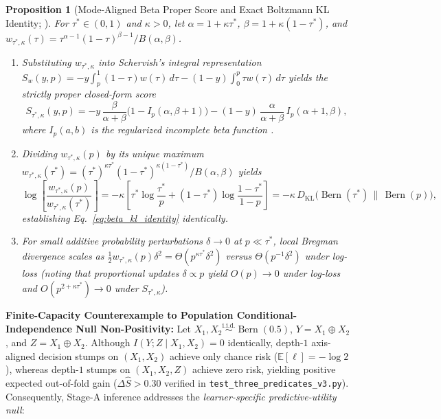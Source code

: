 \documentclass[11pt]{article}
\newtheorem{proposition}{Proposition}
\begin{document}
\begin{proposition}[Mode-Aligned Beta Proper Score and Exact Boltzmann KL Identity; \citealp{schervish1989general,buja2005loss}]
\label{prop:unification}
For $\tau^* \in (0,1)$ and $\kappa > 0$, let $\alpha = 1 + \kappa\tau^*$, $\beta = 1 + \kappa(1-\tau^*)$, and $w_{\tau^*,\kappa}(\tau) = \tau^{\alpha-1}(1-\tau)^{\beta-1}/B(\alpha,\beta)$.
\begin{enumerate}
  \item Substituting $w_{\tau^*,\kappa}$ into Schervish's integral representation $S_w(y,p) = -y\int_p^1(1-\tau)w(\tau)\,d\tau - (1-y)\int_0^p \tau w(\tau)\,d\tau$ yields the strictly proper closed-form score
  \begin{equation}
    S_{\tau^*,\kappa}(y, p) = -y\,\frac{\beta}{\alpha+\beta}\big(1 - I_p(\alpha, \beta+1)\big) - (1-y)\,\frac{\alpha}{\alpha+\beta}\, I_p(\alpha+1, \beta),
    \label{eq:schervish_closed}
  \end{equation}
  where $I_p(a,b)$ is the regularized incomplete beta function \citep{buja2005loss,gneiting2007strictly}.
  \item Dividing $w_{\tau^*,\kappa}(p)$ by its unique maximum $w_{\tau^*,\kappa}(\tau^*) = (\tau^*)^{\kappa\tau^*}(1-\tau^*)^{\kappa(1-\tau^*)}/B(\alpha,\beta)$ yields
  \[
    \log\!\left[\frac{w_{\tau^*,\kappa}(p)}{w_{\tau^*,\kappa}(\tau^*)}\right] = -\kappa\left[\tau^*\log\frac{\tau^*}{p} + (1-\tau^*)\log\frac{1-\tau^*}{1-p}\right] = -\kappa\, D_{\text{KL}}\!\big(\operatorname{Bern}(\tau^*)\,\|\,\operatorname{Bern}(p)\big),
  \]
  establishing Eq.~\eqref{eq:beta_kl_identity} identically.
  \item For small additive probability perturbations $\delta \to 0$ at $p \ll \tau^*$, local Bregman divergence scales as $\tfrac{1}{2}w_{\tau^*,\kappa}(p)\delta^2 = \Theta(p^{\kappa\tau^*}\delta^2)$ versus $\Theta(p^{-1}\delta^2)$ under log-loss (noting that proportional updates $\delta \propto p$ yield $O(p) \to 0$ under log-loss and $O(p^{2+\kappa\tau^*}) \to 0$ under $S_{\tau^*,\kappa}$).
\end{enumerate}
\end{proposition}

\textbf{Finite-Capacity Counterexample to Population Conditional-Independence Null Non-Positivity:} Let $X_1, X_2 \stackrel{\text{i.i.d.}}{\sim} \operatorname{Bern}(0.5)$, $Y = X_1 \oplus X_2$, and $Z = X_1 \oplus X_2$. Although $I(Y; Z \mid X_1, X_2) = 0$ identically, depth-$1$ axis-aligned decision stumps on $(X_1, X_2)$ achieve only chance risk ($\mathbb{E}[\ell] = -\log 2$), whereas depth-$1$ stumps on $(X_1, X_2, Z)$ achieve zero risk, yielding positive expected out-of-fold gain ($\Delta \hat{S} > 0.30$ verified in \texttt{test\_three\_predicates\_v3.py}). Consequently, Stage-A inference addresses the \emph{learner-specific predictive-utility null}:
\end{document}

